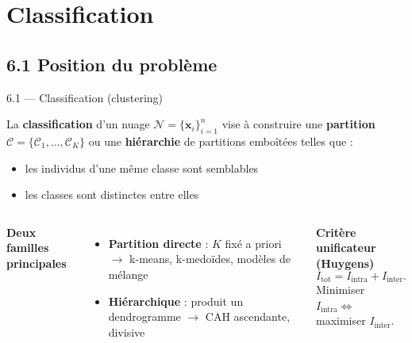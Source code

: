 \section{Classification}

\subsection{6.1 Position du problème}
\begin{frame}{6.1 — Classification (clustering)}
\begin{definition}
La \textbf{classification} d'un nuage $\mathcal{N} = \{\mathbf{x}_i\}_{i=1}^n$ vise à
construire une \textbf{partition} $\mathcal{C} = \{\mathcal{C}_1, \ldots, \mathcal{C}_K\}$ ou une
\textbf{hiérarchie} de partitions emboîtées telles que :
\begin{itemize}
  \item les individus d'une même classe sont \alert{semblables}
  \item les classes sont \alert{distinctes} entre elles
\end{itemize}
\end{definition}

\begin{columns}[T]
\textbf{Deux familles principales}
\begin{itemize}\small
  \item \textbf{Partition directe} : $K$ fixé a priori
        $\to$ k-means, k-medoïdes, modèles de mélange
  \item \textbf{Hiérarchique} : produit un dendrogramme
        $\to$ CAH ascendante, divisive
\end{itemize}

\textbf{Critère unificateur (Huygens)}
\[
I_{\text{tot}} = I_{\text{intra}} + I_{\text{inter}}.
\]
Minimiser $I_{\text{intra}} \Leftrightarrow$ maximiser $I_{\text{inter}}$.
\end{columns}
\end{frame}

